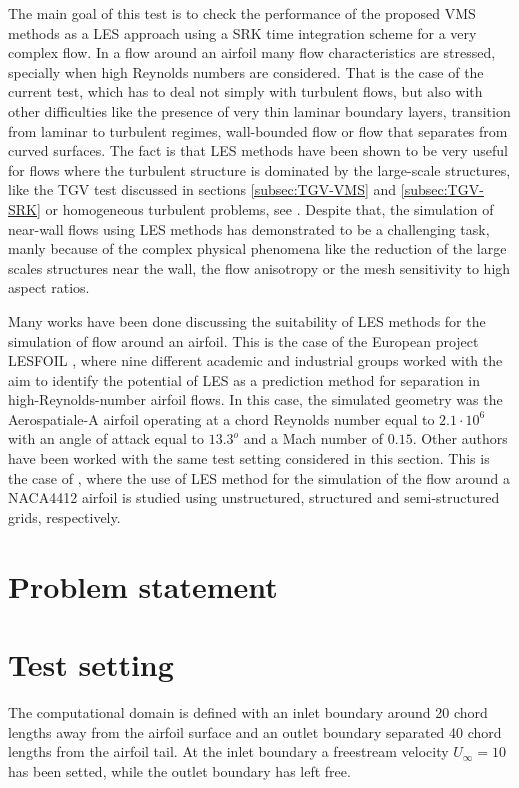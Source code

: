 The main goal of this test is to check the performance of the proposed VMS methods as a LES approach using a SRK time integration scheme for a very complex flow. In a flow around an airfoil many flow characteristics are stressed, specially when high Reynolds numbers are considered. That is the case of the current test, which has to deal not simply with turbulent flows, but also with other difficulties like the presence of very thin laminar boundary layers, transition from laminar to turbulent regimes, wall-bounded flow or flow that separates from curved surfaces. The fact is that LES methods have been shown to be very useful for flows where the turbulent structure is dominated by the large-scale structures, like the TGV test discussed in sections \ref{subsec:TGV-VMS} and \ref{subsec:TGV-SRK} or homogeneous turbulent problems, see \cite{colomes_2014}. Despite that, the simulation of near-wall flows using LES methods has demonstrated to be a challenging task, manly because of the complex physical phenomena like the reduction of the large scales structures near the wall, the flow anisotropy or the mesh sensitivity to high aspect ratios. 

Many works have been done discussing the suitability of LES methods for the simulation of flow around an airfoil. This is the case of the European project LESFOIL \cite{davidson_lesfoil:_2003}, where nine different academic and industrial groups worked with the aim to identify the potential of LES as a prediction method for separation in high-Reynolds-number airfoil flows. In this case, the simulated geometry was the Aerospatiale-A airfoil operating at a chord Reynolds number equal to $2.1\cdot10^6$ with an angle of attack equal to $13.3^o$ and a Mach number of $0.15$. Other authors have been worked with the same test setting considered in this section. This is the case of \cite{jansen_stabilized_1999, kaltenbach_large-eddy_1995, schmidt_assessment_????}, where the use of LES method for the simulation of the flow around a NACA4412 airfoil is studied using unstructured, structured and semi-structured grids, respectively.

\section{Problem statement}
\label{sec-C8_prob_statement}

\section{Test setting}
\label{sec-C8_setting}
The computational domain is defined with an inlet boundary around 20 chord lengths away from the airfoil surface and an outlet boundary separated 40 chord lengths from the airfoil tail. At the inlet boundary a freestream velocity $U_\infty=10$ has been setted, while the outlet boundary has left free. 

